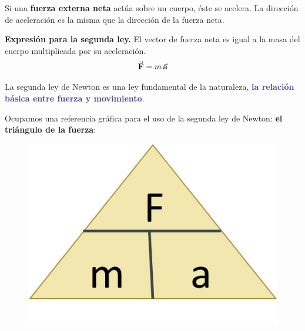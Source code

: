 \documentclass[14pt]{extarticle}
\newcommand{\textocolor}[2]{\textbf{\textcolor{#1}{#2}}}
\begin{document}
Si una \textocolor{darkscarlet}{fuerza externa neta} actúa sobre un cuerpo, éste se acelera. La dirección de aceleración es la misma que la dirección de la fuerza neta. 

\textbf{Expresión para la segunda ley. } El vector de fuerza neta es igual a la masa del cuerpo multiplicada por su aceleración.
\begin{align*}
\va{F} = m \, \va{a}
\end{align*}

La segunda ley de Newton es una ley fundamental de la naturaleza, \textocolor{darkslateblue}{la relación básica entre fuerza y movimiento}.

Ocupamos una referencia gráfica para el uso de la segunda ley de Newton: \textocolor{debianred}{el triángulo de la fuerza}:
\begin{figure}[H]
    \centering
\includegraphics[scale=1.5]{Imagenes/Newton_11.jpg}
\end{figure}




\end{document}
